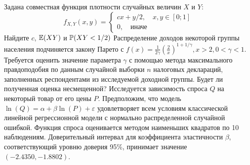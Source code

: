 \documentclass[addpoints, answers]{exam} %
\begin{document}
\begin{questions}
\question Задана совместная функция плотности случайных величин $X$ и $Y$:
\[
f_{X,Y}(x,y)=\left\{\begin{array}{c}
cx+y/2,\quad x,y\in [0;1] \\
0,\quad \mbox{иначе}
\end{array}  \right.
\]
Найдите $c$, $\E(XY)$ и $\P(XY<1/2)$
\question Распределение доходов некоторой группы населения подчиняется закону Парето с $f(x)=\frac{1}{2\gamma}\left(\frac{2}{x}\right)^{1+1/\gamma}, x>2, 0<\gamma<1$.
Требуется оценить значение параметра $\gamma$ с помощью метода максимального правдоподобия по данным случайной выборки $n$ налоговых деклараций, заполненных респондентами из исследуемой доходной группы. Будет ли полученная оценка несмещенной?
\question Исследуется зависимость спроса $Q$ на некоторый товар от его цены $P$. Предположим, что модель $\ln(Q)=\alpha+\beta\ln(P)+\varepsilon$ удовлетворяет всем условиям классической линейной регрессионной модели с нормально распределенной случайной ошибкой. Функция спроса оценивается методом наименьших квадратов по 10 наблюдениям. Доверительный интервал для коэффициента эластичности $\beta$, соответствующий уровню доверия 95\%, принимает значение $(-2.4350,-1.8802)$.
\end{questions}
\end{document}
